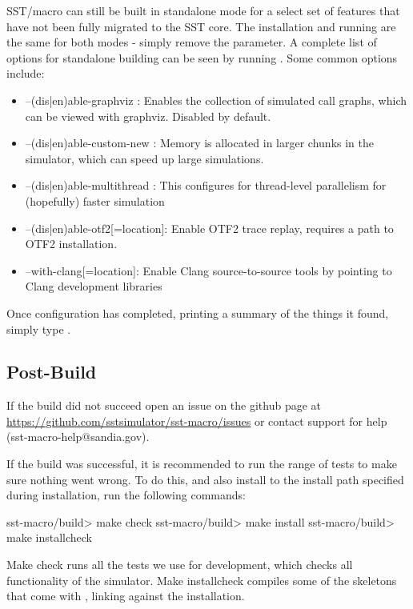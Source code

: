 SST/macro can still be built in standalone mode for a select set of features that have not been fully migrated to the SST core.  
The installation and running are the same for both modes - simply remove the  parameter.  
A complete list of options for standalone building can be seen by running .   Some common options include:

\begin{itemize}
\item --(dis|en)able-graphviz : Enables the collection of simulated call graphs, which can be viewed with graphviz.
Disabled by default.
\item --(dis|en)able-custom-new : Memory is allocated in larger chunks in the simulator, which can speed up large simulations.
\item --(dis|en)able-multithread : This configures for thread-level parallelism for (hopefully) faster simulation
\item --(dis|en)able-otf2[=location]: Enable OTF2 trace replay, requires a path to OTF2 installation.
\item --with-clang[=location]: Enable Clang source-to-source tools by pointing to Clang development libraries
\end{itemize}

Once configuration has completed, printing a summary of the things it found, simply type .  

\subsection{Post-Build}
\label{subsec:postbuild}

If the build did not succeed open an issue on the github page at \url{https://github.com/sstsimulator/sst-macro/issues} or contact \sstmacro support for help (sst-macro-help@sandia.gov).

If the build was successful, it is recommended to run the range of tests to make sure nothing went wrong.  
To do this, and also install \sstmacro  to the install path specified during installation, run the following commands:

\begin{ShellCmd}
sst-macro/build> make check
sst-macro/build> make install
sst-macro/build> make installcheck
\end{ShellCmd}
Make check runs all the tests we use for development, which checks all functionality of the simulator.  
Make installcheck compiles some of the skeletons that come with \sstmacro, linking against the installation.  

